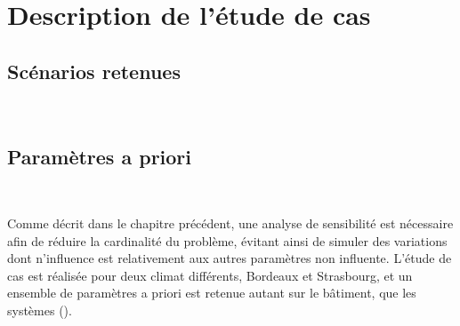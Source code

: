 




\section{Description de l’étude de cas} %
\label{sec:description_de_l_etude_de_cas}
\subsection{Scénarios retenues} %
\label{sub:scenarios_retenues}
~



\subsection{Paramètres a priori} %
\label{sub:parametres_a_priori}
~


Comme décrit dans le chapitre précédent, une analyse de sensibilité est nécessaire
afin de réduire la cardinalité du problème, évitant ainsi de simuler des variations
dont n’influence est relativement aux autres paramètres non influente.
L’étude de cas est réalisée pour deux climat différents, Bordeaux et Strasbourg,
et un ensemble de paramètres a priori est retenue autant sur le bâtiment, que les
systèmes ().

